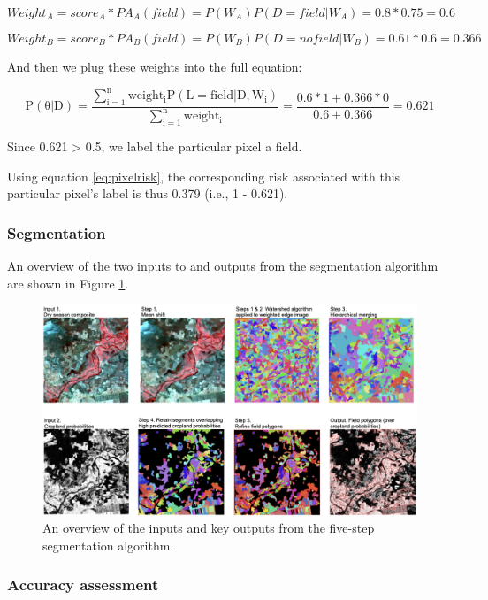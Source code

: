 \documentclass[
  11pt,
  a4paper]{article}
\begin{document}
\[
Weight_A = score_A * PA_A(field) = P(W_A)P(D=field|W_A) = 0.8 * 0.75 = 0.6
\]

\[
Weight_B = score_B * PA_B(field) = P(W_B)P(D=no field|W_B) = 0.61 * 0.6 = 0.366
\]

And then we plug these weights into the full equation:

\[
\mathrm{P(\theta|D)=\frac{\sum_{i=1}^{n}weight_iP(L = field|D, W_i)}{\sum_{i=1}^{n}weight_i}} = \frac{0.6 * 1 + 0.366 * 0}{0.6 + 0.366} = 0.621
\]

Since 0.621 \textgreater{} 0.5, we label the particular pixel a field.

Using equation \ref{eq:pixelrisk}, the corresponding risk associated
with this particular pixel's label is thus 0.379 (i.e., 1 - 0.621).

\hypertarget{segmentation}{%
\subsubsection{Segmentation}\label{segmentation}}

An overview of the two inputs to and outputs from the segmentation
algorithm are shown in Figure \ref{fig:segfig}.

\begin{figure}[!ht]

{\centering \includegraphics[width=1\linewidth,]{figures/si_segmentation_workflow} 

}

\caption{An overview of the inputs and key outputs from the five-step segmentation algorithm.}\label{fig:segfig}
\end{figure}

\hypertarget{accuracy-assessment}{%
\subsubsection{Accuracy assessment}\label{accuracy-assessment}}
\end{document}
